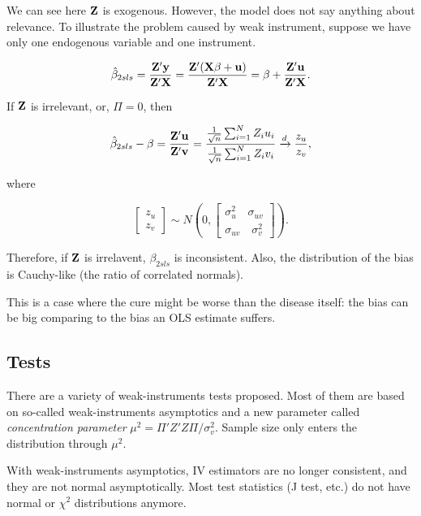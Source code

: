 We can see here $\bf Z$ is exogenous.  However, the model does not say
anything about relevance.  To illustrate the problem caused by weak
instrument, suppose we have only one endogenous variable and one
instrument.  

\begin{equation}
\hat \beta_{2sls}=\frac{\bf Z' y}{\bf Z' X} = \frac{\bf Z'(X \beta +
  u)}{\bf Z'
  X}= \beta + \frac{\bf Z' u}{\bf Z' X} . \label{eqn:wk3}
\end{equation}

If $\bf Z$ is irrelevant, or, $\Pi=0$, then

\begin{equation}
\hat \beta_{2sls}- \beta=\frac{\bf Z' u}{\bf Z' v} =\frac{ \frac{1}{\sqrt n}
\sum_{i=1}^N Z_i u_i}{\frac{1}{\sqrt n} \sum_{i=1}^N Z_i v_i}
\xrightarrow{d} \frac{z_u}{z_v} ,
\end{equation}

where

\begin{equation}
\begin{bmatrix}
z_u \\z_v
\end{bmatrix}
\sim N(0, \begin{bmatrix}
\sigma_u^2 \quad \sigma_{uv} \\  \sigma_{uv} \quad \sigma_v^2
\end{bmatrix}).
\end{equation}

Therefore, if $\bf Z$ is irrelavent, $\beta_{2sls}$ is inconsistent.
Also, the distribution of the bias is Cauchy-like (the ratio of
correlated normals).

This is a case where the cure might be worse than the disease itself:
the bias can be big comparing to the bias an OLS estimate suffers.

\subsection{Tests}

There are a variety of weak-instruments tests proposed.  Most of them
are based on so-called weak-instruments asymptotics and a new
parameter called {\em concentration parameter} $\mu^2 = \Pi' Z' Z \Pi
/ \sigma_v^2$.  Sample size only enters the distribution through
$\mu^2$.

With weak-instruments asymptotics, IV estimators are no longer
consistent, and they are not normal asymptotically.  Most test
statistics (J test, etc.) do not have normal or $\chi^2$ distributions
anymore.

